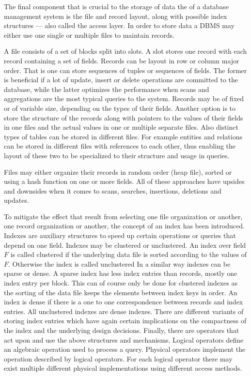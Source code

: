     The final component that is crucial to the storage of data the  of a database management system is the file and record layout, along with possible index structures --- also called the access layer. 
    In order to store data a DBMS may either use one single or multiple files to maintain records. 

    A file consists of a set of blocks split into slots.
    A slot stores one record with each record containing a set of fields.
    Records can be layout in row or column major order.
    That is one can store sequences of tuples or sequences of fields.
    The former is beneficial if a lot of update, insert or delete operations are committed to the database, while the latter optimizes the performance when scans and aggregations are the most typical queries to the system.
    Records may be of fixed or of variable size, depending on the types of their fields. 
    Another option is to store the structure of the records along with pointers to the values of their fields in one files and the actual values in one or multiple separate files. 
    Also distinct types of tables can be stored in different files. 
    For example entities and relations can be stored in different files with references to each other, thus enabling the layout of these two to be specialized to their structure and usage in queries.

    Files may either organize their records in random order (heap file), sorted or using a hash function on one or more fields. 
    All of these approaches have upsides and downsides when it comes to scans, searches, insertions, deletions and updates. 

    To mitigate the effect that result from selecting one file organization or another, one record organization or another, the concept of an index has been introduced. 
    Indexes are auxiliary structures to speed up certain operations or queries that depend on one field. 
    Indexes may be clustered or unclustered. 
    An index over field $F$ is called clustered if the underlying data file is sorted according to the values of $F$. 
    Otherwise the index is called unclustered
    In a similar way indexes can be sparse or dense. 
    A sparse index has less index entries than records, mostly one index entry per block. 
    This can of course only be done for clustered indexes as the sorting of the data file keeps the elements between index keys in order. 
    An index is dense if there is a one to one correspondence between records and index entries. 
    All unclustered indexes are dense indexes.
    There are different variants of storing index entries which have again certain implications on the compactness of the index and the underlying design decisions.
    Finally, there are operators that act upon and use the above structures and mechanisms. 
    Logical operators define an algebraic operation used to process a query.
    Physical operators implement the operation described by logical operators. For each logical operator there may exist multiple different physical implementations using different access methods.

